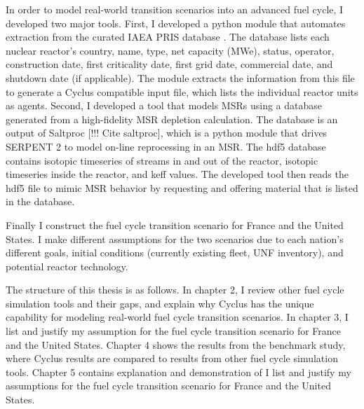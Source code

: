 In order to model real-world transition scenarios into an advanced
fuel cycle, I developed two major tools. First, I developed a python
module that automates extraction from the curated \gls{IAEA} \gls{PRIS} database
\cite{iaea_nuclear_2018}. The database lists each nuclear reactor's
country, name, type, net capacity (\gls{MWe}), status, operator, construction
date, first criticality date, first grid date, commercial date, and shutdown
date (if applicable). The module extracts the information from this file
to generate a Cyclus compatible input file, which lists the individual
reactor units as agents. Second, I developed a tool that models \glspl{MSR}
using a database generated from a high-fidelity \gls{MSR} depletion calculation.
The database is an output of Saltproc [!!! Cite saltproc], which is a python
module that drives
SERPENT 2 \cite{leppanen_serpentcontinuous-energy_2013} to model on-line reprocessing in an \gls{MSR}.
The hdf5 database contains isotopic timeseries of streams in and out of the reactor,
isotopic timeseries inside the reactor, and keff values. The developed tool then
reads the hdf5 file to mimic \gls{MSR} behavior by requesting and offering
material that is listed in the database.

Finally I construct the fuel cycle transition scenario for France and the United States.
I make different assumptions for the two scenarios due to each nation's different goals,
initial conditions (currently existing fleet, \gls{UNF} inventory), and potential reactor
technology.

The structure of this thesis is as follows. In chapter 2, I review other fuel cycle simulation
tools and their gaps, and explain why Cyclus
has the unique capability for modeling real-world fuel cycle transition scenarios.
In chapter 3, I list and justify my assumption for the fuel cycle transition
scenario for France and the United States.
Chapter 4 shows the results from the benchmark study, where Cyclus results are compared
to results from other fuel cycle simulation tools.
Chapter 5 contains explanation and demonstration of  
 I list and justify my assumptions
for the fuel cycle transition scenario for France and the United States. 

\iffalse
For France, I model the entire \gls{EU} region to calculate \gls{UNF} inventory
in each \gls{EU} nation. This is because France would need to receive \gls{UNF} from other
nations to quickly transition into a \gls{SFR} fleet, since their \gls{UNF} inventory
is small due to their long history of reprocessing for \gls{LWR} \gls{MOX} fuel production.
\fi


